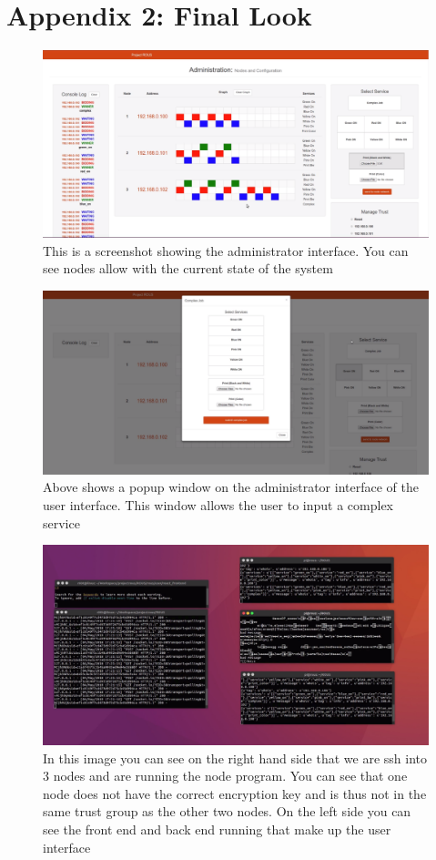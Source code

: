 \documentclass[draftclsnofoot, onecolumn, compsoc, 10pt]{IEEEtran}
\begin{document}
\section{Appendix 2: Final Look}
\begin{figure}[H]
\centering
    \includegraphics[scale=0.45]{img1}
    \caption{This is a screenshot showing the administrator interface. You can see nodes allow with the current state of the system}
\end{figure}
\begin{figure}[H]
\centering
    \includegraphics[scale=0.45]{img2}
    \caption{Above shows a popup window on the administrator interface of the user interface. This window allows the user to input a complex service}
\end{figure}
\begin{figure}[H]
\centering
    \includegraphics[scale=0.45]{img3}
    \caption{In this image you can see on the right hand side that we are ssh into 3 nodes and are running the node program. You can see that one node does not have the correct encryption key and is thus not in the same trust group as the other two nodes. On the left side you can see the front end and back end running that make up the user interface}
\end{figure}
\end{document}
